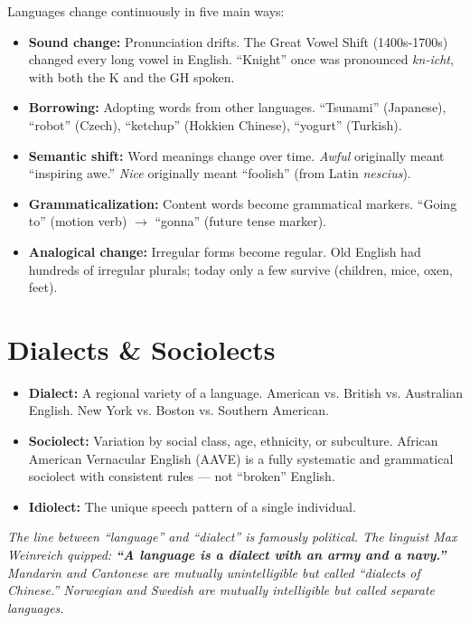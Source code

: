 \documentclass[11pt, letterpaper]{article}
\begin{document}
Languages change continuously in five main ways:
\begin{itemize}[noitemsep]
  \item \textbf{Sound change:} Pronunciation drifts. The Great Vowel Shift (1400s-1700s) changed every long vowel in English. ``Knight'' once was pronounced \emph{kn-icht}, with both the K and the GH spoken.
  \item \textbf{Borrowing:} Adopting words from other languages. ``Tsunami'' (Japanese), ``robot'' (Czech), ``ketchup'' (Hokkien Chinese), ``yogurt'' (Turkish).
  \item \textbf{Semantic shift:} Word meanings change over time. \emph{Awful} originally meant ``inspiring awe.'' \emph{Nice} originally meant ``foolish'' (from Latin \emph{nescius}).
  \item \textbf{Grammaticalization:} Content words become grammatical markers. ``Going to'' (motion verb) $\to$ ``gonna'' (future tense marker).
  \item \textbf{Analogical change:} Irregular forms become regular. Old English had hundreds of irregular plurals; today only a few survive (children, mice, oxen, feet).
\end{itemize}

\section*{Dialects \& Sociolects}

\begin{itemize}[noitemsep]
  \item \textbf{Dialect:} A regional variety of a language. American vs. British vs. Australian English. New York vs. Boston vs. Southern American.
  \item \textbf{Sociolect:} Variation by social class, age, ethnicity, or subculture. African American Vernacular English (AAVE) is a fully systematic and grammatical sociolect with consistent rules --- not ``broken'' English.
  \item \textbf{Idiolect:} The unique speech pattern of a single individual.
\end{itemize}

\textit{The line between ``language'' and ``dialect'' is famously political. The linguist Max Weinreich quipped: \textbf{``A language is a dialect with an army and a navy.''} Mandarin and Cantonese are mutually unintelligible but called ``dialects of Chinese.'' Norwegian and Swedish are mutually intelligible but called separate languages.}
\end{document}
